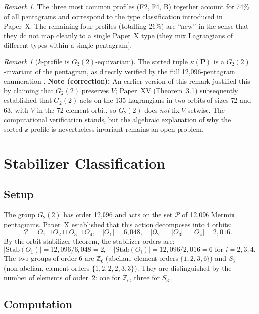 \documentclass[11pt,a4paper]{article}
\theoremstyle{remark}
\newtheorem{remark}[theorem]{Remark}
\newcommand{\PP}{\mathcal{P}}
\begin{document}
\begin{remark}
The three most common profiles (F2, F4, B) together account for 74\% of all
pentagrams and correspond to the type classification introduced in Paper~X.
The remaining four profiles (totalling 26\%) are ``new'' in the sense that they
do not map cleanly to a single Paper~X type (they mix Lagrangians of different
types within a single pentagram).
\end{remark}

\begin{remark}[$k$-profile is $G_2(2)$-equivariant]
The sorted tuple $\kappa(\mathbf{P})$ is a $G_2(2)$-invariant of the pentagram,
as directly verified by the full 12{,}096-pentagram enumeration
\cite{PaperXIVsuppl}.
\textbf{Note (correction):}
An earlier version of this remark justified this by claiming that $G_2(2)$
preserves $V$; Paper~XV (Theorem~3.1) subsequently established that $G_2(2)$
acts on the 135 Lagrangians in two orbits of sizes 72 and 63, with
$V$ in the 72-element orbit, so $G_2(2)$ does \emph{not} fix $V$ setwise.
The computational verification stands, but the algebraic explanation of why the
sorted $k$-profile is nevertheless invariant remains an open problem.
\end{remark}


\section{Stabilizer Classification}\label{sec:stabilizer}

\subsection{Setup}

The group $G_2(2)$ has order 12{,}096 and acts on the set $\PP$ of
12{,}096 Mermin pentagrams.
Paper~X \cite{PaperX} established that this action decomposes into 4 orbits:
\[
  \PP = O_1 \sqcup O_2 \sqcup O_3 \sqcup O_4,
  \quad |O_1| = 6{,}048, \quad |O_2| = |O_3| = |O_4| = 2{,}016.
\]
By the orbit-stabilizer theorem, the stabilizer orders are:
\[
  |\mathrm{Stab}(O_1)| = 12{,}096/6{,}048 = 2, \quad
  |\mathrm{Stab}(O_i)| = 12{,}096/2{,}016 = 6 \text{ for } i=2,3,4.
\]
The two groups of order 6 are $\mathbb{Z}_6$ (abelian, element orders $\{1,2,3,6\}$)
and $S_3$ (non-abelian, element orders $\{1,2,2,2,3,3\}$).
They are distinguished by the number of elements of order~2: one for
$\mathbb{Z}_6$, three for $S_3$.

\subsection{Computation}
\end{document}
